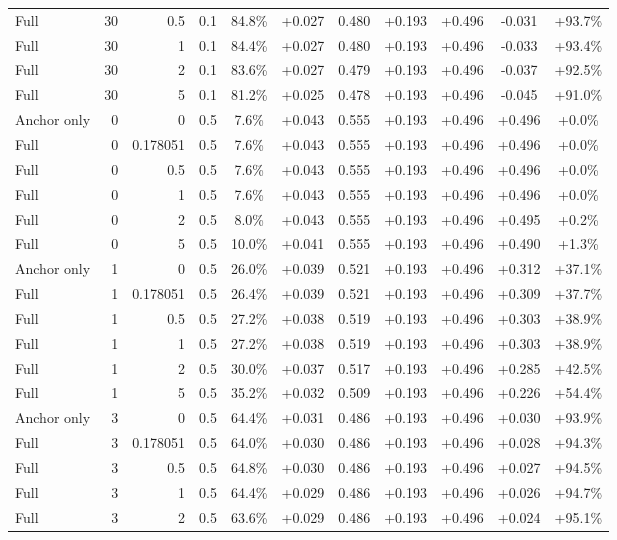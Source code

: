 \begin{table}[htbp]
\begin{tabular}{lrrrccccccc}
Full & 30 & 0.5 & 0.1 & 84.8\% & +0.027 & 0.480 & +0.193 & +0.496 & -0.031 & +93.7\% \\
Full & 30 & 1 & 0.1 & 84.4\% & +0.027 & 0.480 & +0.193 & +0.496 & -0.033 & +93.4\% \\
Full & 30 & 2 & 0.1 & 83.6\% & +0.027 & 0.479 & +0.193 & +0.496 & -0.037 & +92.5\% \\
Full & 30 & 5 & 0.1 & 81.2\% & +0.025 & 0.478 & +0.193 & +0.496 & -0.045 & +91.0\% \\
Anchor only & 0 & 0 & 0.5 & 7.6\% & +0.043 & 0.555 & +0.193 & +0.496 & +0.496 & +0.0\% \\
Full & 0 & 0.178051 & 0.5 & 7.6\% & +0.043 & 0.555 & +0.193 & +0.496 & +0.496 & +0.0\% \\
Full & 0 & 0.5 & 0.5 & 7.6\% & +0.043 & 0.555 & +0.193 & +0.496 & +0.496 & +0.0\% \\
Full & 0 & 1 & 0.5 & 7.6\% & +0.043 & 0.555 & +0.193 & +0.496 & +0.496 & +0.0\% \\
Full & 0 & 2 & 0.5 & 8.0\% & +0.043 & 0.555 & +0.193 & +0.496 & +0.495 & +0.2\% \\
Full & 0 & 5 & 0.5 & 10.0\% & +0.041 & 0.555 & +0.193 & +0.496 & +0.490 & +1.3\% \\
Anchor only & 1 & 0 & 0.5 & 26.0\% & +0.039 & 0.521 & +0.193 & +0.496 & +0.312 & +37.1\% \\
Full & 1 & 0.178051 & 0.5 & 26.4\% & +0.039 & 0.521 & +0.193 & +0.496 & +0.309 & +37.7\% \\
Full & 1 & 0.5 & 0.5 & 27.2\% & +0.038 & 0.519 & +0.193 & +0.496 & +0.303 & +38.9\% \\
Full & 1 & 1 & 0.5 & 27.2\% & +0.038 & 0.519 & +0.193 & +0.496 & +0.303 & +38.9\% \\
Full & 1 & 2 & 0.5 & 30.0\% & +0.037 & 0.517 & +0.193 & +0.496 & +0.285 & +42.5\% \\
Full & 1 & 5 & 0.5 & 35.2\% & +0.032 & 0.509 & +0.193 & +0.496 & +0.226 & +54.4\% \\
Anchor only & 3 & 0 & 0.5 & 64.4\% & +0.031 & 0.486 & +0.193 & +0.496 & +0.030 & +93.9\% \\
Full & 3 & 0.178051 & 0.5 & 64.0\% & +0.030 & 0.486 & +0.193 & +0.496 & +0.028 & +94.3\% \\
Full & 3 & 0.5 & 0.5 & 64.8\% & +0.030 & 0.486 & +0.193 & +0.496 & +0.027 & +94.5\% \\
Full & 3 & 1 & 0.5 & 64.4\% & +0.029 & 0.486 & +0.193 & +0.496 & +0.026 & +94.7\% \\
Full & 3 & 2 & 0.5 & 63.6\% & +0.029 & 0.486 & +0.193 & +0.496 & +0.024 & +95.1\% \\

\end{tabular}
\end{table}
